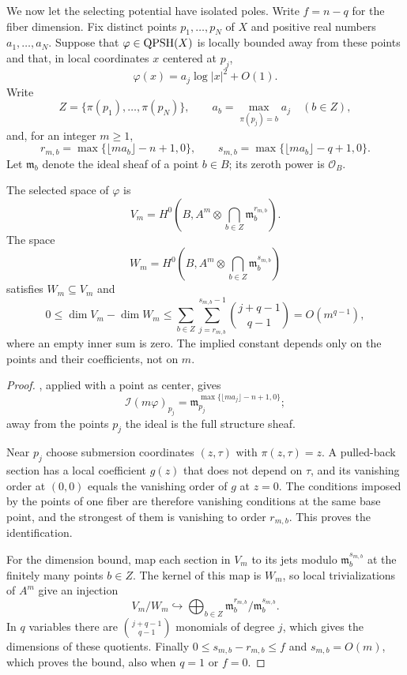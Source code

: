 We now let the selecting potential have isolated poles. Write $f=n-q$ for the fiber dimension. Fix distinct points $p_1,\ldots,p_N$ of $X$ and positive real numbers $a_1,\ldots,a_N$. Suppose that $\varphi\in\mathrm{QPSH}(X)$ is locally bounded away from these points and that, in local coordinates $x$ centered at $p_j$,
\begin{equation}\label{eq:isolated-selecting-poles}
 \varphi(x)=a_j\log|x|^2+O(1).
\end{equation}
Write
\[
 Z=\{\pi(p_1),\ldots,\pi(p_N)\},\qquad
 a_b=\max_{\pi(p_j)=b}a_j\quad(b\in Z),
\]
and, for an integer $m\geq1$,
\[
 r_{m,b}=\max\{\lfloor ma_b\rfloor-n+1,0\},\qquad
 s_{m,b}=\max\{\lfloor ma_b\rfloor-q+1,0\}.
\]
Let $\mathfrak m_b$ denote the ideal sheaf of a point $b\in B$; its zeroth power is $\mathcal O_B$.

\begin{proposition}\label{prop:isolated-pole-section-descent}
The selected space of $\varphi$ is
\[
 V_m=H^0\left(B,A^m\otimes
                       \bigcap_{b\in Z}\mathfrak m_b^{r_{m,b}}\right).
\]
The space
\[
 W_m=H^0\left(B,A^m\otimes
                       \bigcap_{b\in Z}\mathfrak m_b^{s_{m,b}}\right)
\]
satisfies $W_m\subseteq V_m$ and
\[
 0\leq\dim V_m-\dim W_m
 \leq\sum_{b\in Z}\sum_{j=r_{m,b}}^{s_{m,b}-1}
                         \binom{j+q-1}{q-1}
 =O(m^{q-1}),
\]
where an empty inner sum is zero. The implied constant depends only on the points and their coefficients, not on $m$.
\end{proposition}
\begin{proof}
, applied with a point as center, gives
\[
 \mathcal I(m\varphi)_{p_j}=\mathfrak m_{p_j}^{\max\{\lfloor ma_j\rfloor-n+1,0\}};
\]
away from the points $p_j$ the ideal is the full structure sheaf.

Near $p_j$ choose submersion coordinates $(z,\tau)$ with $\pi(z,\tau)=z$. A pulled-back section has a local coefficient $g(z)$ that does not depend on $\tau$, and its vanishing order at $(0,0)$ equals the vanishing order of $g$ at $z=0$. The conditions imposed by the points of one fiber are therefore vanishing conditions at the same base point, and the strongest of them is vanishing to order $r_{m,b}$. This proves the identification.

For the dimension bound, map each section in $V_m$ to its jets modulo $\mathfrak m_b^{s_{m,b}}$ at the finitely many points $b\in Z$. The kernel of this map is $W_m$, so local trivializations of $A^m$ give an injection
\[
 V_m/W_m\hookrightarrow
       \bigoplus_{b\in Z}\mathfrak m_b^{r_{m,b}}/
                                      \mathfrak m_b^{s_{m,b}}.
\]
In $q$ variables there are $\binom{j+q-1}{q-1}$ monomials of degree $j$, which gives the dimensions of these quotients. Finally $0\leq s_{m,b}-r_{m,b}\leq f$ and $s_{m,b}=O(m)$, which proves the bound, also when $q=1$ or $f=0$.
\end{proof}

